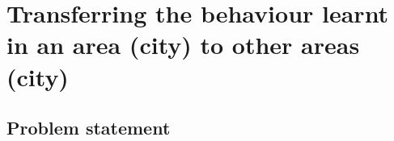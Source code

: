 \chapter{Transferring the behaviour learnt in an area (city) to other areas (city)}

\ifpdf
    \graphicspath{{Chapter6/Figs/Raster/}{Chapter6/Figs/PDF/}{Chapter6/Figs/}}
\else
    \graphicspath{{Chapter6/Figs/Vector/}{Chapter6/Figs/}}
\fi

\section{Problem statement}

